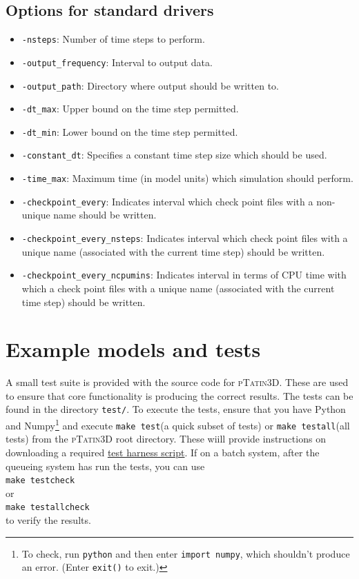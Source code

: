 \documentclass[paper=a4, fontsize=11pt,twoside]{scrartcl}
\newcommand{\ptat}{{{\textsc{pTatin3D}}}}
\newcommand{\shellcmd}[1]{\\\indent\indent\texttt{\hspace{5mm}\footnotesize #1}\\}
\newcommand{\unix}[1]{\texttt{\footnotesize #1}}
\begin{document}
{{\subsection{Options for standard drivers}
\begin{itemize}
	\item \unix{-nsteps}: Number of time steps to perform.
	\item \unix{-output\_frequency}: Interval to output data.
	\item \unix{-output\_path}: Directory where output should be written to.
	\item \unix{-dt\_max}: Upper bound on the time step permitted.
	\item \unix{-dt\_min}: Lower bound on the time step permitted.
	\item \unix{-constant\_dt}: Specifies a constant time step size which should be used.
	\item \unix{-time\_max}: Maximum time (in model units) which simulation should perform.
	\item \unix{-checkpoint\_every}: Indicates interval which check point files with a non-unique name should be written.
	\item \unix{-checkpoint\_every\_nsteps}: Indicates interval which check point files with a unique name (associated with the current time step) should be written.
	\item \unix{-checkpoint\_every\_ncpumins}: Indicates interval in terms of CPU time with which a check point files with a unique name (associated with the current time step) should be written.
\end{itemize}

\newpage
\section{Example models and tests}
\label{sec:examples_and_tests}
A small test suite is provided with the source code for {\ptat}. These are used to ensure that core functionality is producing the correct results. The tests can be found in the directory \unix{test/}. To execute the tests, ensure that you have Python and Numpy\footnote{To check, run \unix{python} and then enter \unix{import numpy}, which shouldn't produce an error. (Enter \unix{exit()} to exit.)} and execute \unix{make test}(a quick subset of tests) or \unix{make testall}(all tests) from the \ptat{} root directory.
These wiill provide instructions on downloading a required \href{https://www.bitbucket.org/dmay/pythontestharness}{test harness script}.
If on a batch system, after the queueing system has run the tests, you can use \shellcmd{make testcheck} or \shellcmd{make testallcheck} to verify the results.

}}
\end{document}
